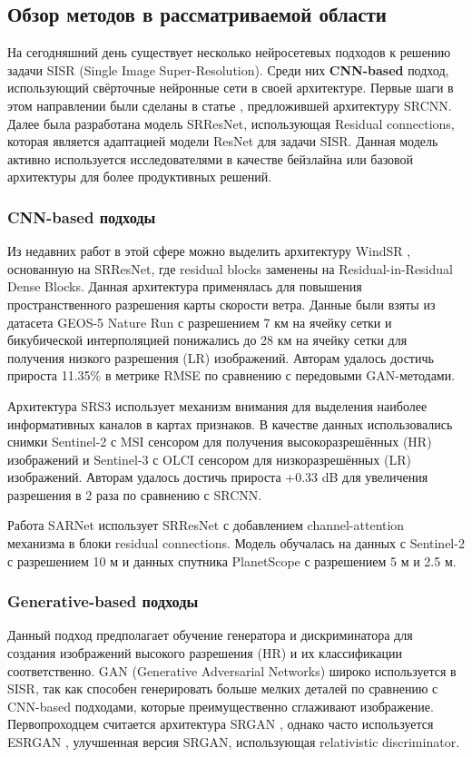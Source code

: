 \documentclass[14pt]{extarticle}
\begin{document}
\subsection{Обзор методов в рассматриваемой области}
На сегодняшний день существует несколько нейросетевых подходов к решению задачи SISR (Single Image Super-Resolution). Среди них \textbf{CNN-based} подход, использующий свёрточные нейронные сети в своей архитектуре. Первые шаги в этом направлении были сделаны в статье \cite{DL2015}, предложившей архитектуру SRCNN. Далее была разработана модель SRResNet, использующая Residual connections, которая является адаптацией модели ResNet для задачи SISR. Данная модель активно используется исследователями в качестве бейзлайна или базовой архитектуры для более продуктивных решений.

\subsubsection{CNN-based подходы}
Из недавних работ в этой сфере можно выделить архитектуру WindSR \cite{WindSR}, основанную на SRResNet, где residual blocks заменены на Residual-in-Residual Dense Blocks. Данная архитектура применялась для повышения пространственного разрешения карты скорости ветра. Данные были взяты из датасета GEOS-5 Nature Run с разрешением 7 км на ячейку сетки и бикубической интерполяцией понижались до 28 км на ячейку сетки для получения низкого разрешения (LR) изображений. Авторам удалось достичь прироста 11.35\% в метрике RMSE по сравнению с передовыми GAN-методами.


Архитектура SRS3 \cite{SRS3} использует механизм внимания для выделения наиболее информативных каналов в картах признаков. В качестве данных использовались снимки Sentinel-2 с MSI сенсором для получения высокоразрешённых (HR) изображений и Sentinel-3 с OLCI сенсором для низкоразрешённых (LR) изображений. Авторам удалось достичь прироста +0.33 dB для увеличения разрешения в 2 раза по сравнению с SRCNN.

Работа SARNet \cite{SARNet} использует SRResNet с добавлением channel-attention механизма в блоки residual connections. Модель обучалась на данных с Sentinel-2 с разрешением 10 м и данных спутника PlanetScope с разрешением 5 м и 2.5 м.

\subsubsection{Generative-based подходы}

Данный подход предполагает обучение генератора и дискриминатора для создания изображений высокого разрешения (HR) и их классификации соответственно. GAN (Generative Adversarial Networks) широко используется в SISR, так как способен генерировать больше мелких деталей по сравнению с CNN-based подходами, которые преимущественно сглаживают изображение. Первопроходцем считается архитектура SRGAN \cite{SRGAN}, однако часто используется ESRGAN \cite{wang2018esrgan}, улучшенная версия SRGAN, использующая relativistic discriminator.
\end{document}
